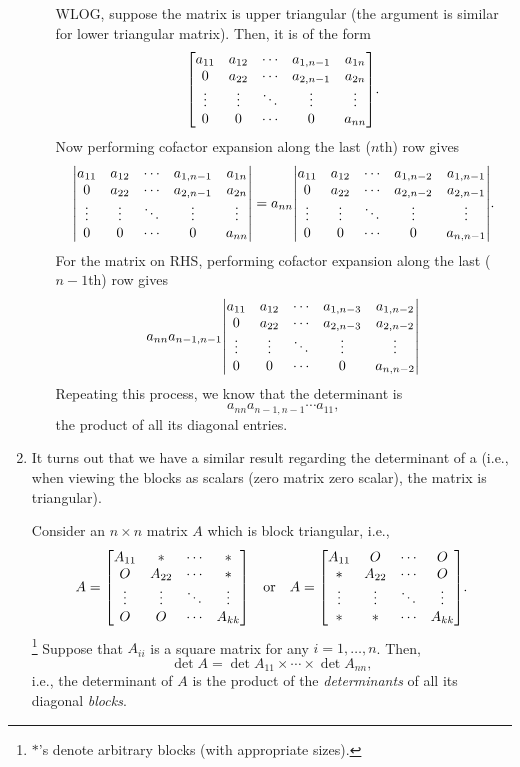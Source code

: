 \begin{enumerate}
\begin{itemize}
\begin{pf}
WLOG, suppose the matrix is upper triangular (the argument is similar for lower
triangular matrix). Then, it is of the form
\[
\mqty[
a_{11}&a_{12}&\cdots&a_{1,n-1}&a_{1n}\\
0&a_{22}&\cdots&a_{2,n-1}&a_{2n}\\
\vdots&\vdots&\ddots&\vdots&\vdots\\
0&0&\cdots&0&a_{nn}
].
\]
Now performing cofactor expansion along the last (\(n\)th) row gives
\[
\mqty|
a_{11}&a_{12}&\cdots&a_{1,n-1}&a_{1n}\\
0&a_{22}&\cdots&a_{2,n-1}&a_{2n}\\
\vdots&\vdots&\ddots&\vdots&\vdots\\
0&0&\cdots&0&a_{nn}
|
=a_{nn}\mqty|
a_{11}&a_{12}&\cdots&a_{1,n-2}&a_{1,n-1}\\
0&a_{22}&\cdots&a_{2,n-2}&a_{2,n-1}\\
\vdots&\vdots&\ddots&\vdots&\vdots\\
0&0&\cdots&0&a_{n,n-1}
|.
\]
For the matrix on RHS, performing cofactor expansion along the last (\(n-1\)th)
row gives
\[
a_{nn}a_{n-1,n-1}\mqty|
a_{11}&a_{12}&\cdots&a_{1,n-3}&a_{1,n-2}\\
0&a_{22}&\cdots&a_{2,n-3}&a_{2,n-2}\\
\vdots&\vdots&\ddots&\vdots&\vdots\\
0&0&\cdots&0&a_{n,n-2}
|
\]
Repeating this process, we know that the determinant is
\[
a_{nn}a_{n-1,n-1}\dotsb a_{11},
\]
the product of all its diagonal entries.
\end{pf}

\end{itemize}
\item \label{it:deter-block-triang}
It turns out that we have a similar result regarding the determinant of a
 (i.e., when viewing the blocks as scalars (zero
matrix  zero scalar), the matrix is triangular).

Consider an \(n\times n\) matrix \(A\) which is block triangular, i.e.,
\[
A=\mqty[
A_{11}&*&\cdots&*\\
O&A_{22}&\cdots&*\\
\vdots&\vdots&\ddots&\vdots\\
O&O&\cdots&A_{kk}
]
\qqtext{or}
A=\mqty[
A_{11}&O&\cdots&O\\
*&A_{22}&\cdots&O\\
\vdots&\vdots&\ddots&\vdots\\
*&*&\cdots&A_{kk}
].
\]
\footnote{\(*\)'s denote arbitrary blocks (with appropriate sizes).}
Suppose that \(A_{ii}\) is a square matrix for any \(i=1,\dotsc,n\). Then,
\[
\det A=\det A_{11}\times \dotsb\times \det A_{nn},
\]
i.e., the determinant of \(A\) is the product of the \emph{determinants} of all
its diagonal \emph{blocks}.
\end{enumerate}
